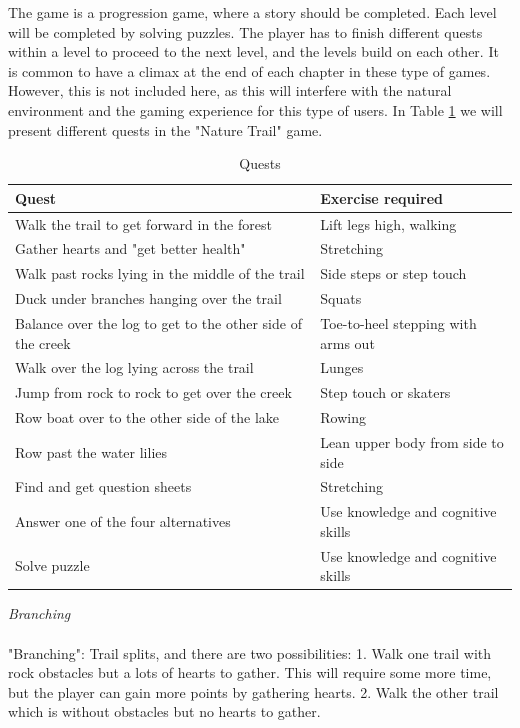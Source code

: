 The game is a progression game, where a story should be completed. Each level will be completed by solving puzzles. The player has to finish different quests within a level to proceed to the next level, and the levels build on each other. It is common to have a climax at the end of each chapter in these type of games. However, this is not included here, as this will interfere with the natural environment and the gaming experience for this type of users. In Table \ref{tab:quests1} we will present different quests in the "Nature Trail" game. 
  
\begin{table}
\begin{tabular}{|>{\raggedright}p{}|p{}|}
\hline
\textbf{Quest} & \textbf{Exercise required}  \\ \hline
Walk the trail to get forward in the forest & Lift legs high, walking  \\ \hline
Gather hearts and "get better health" &  Stretching \\ \hline
Walk past rocks lying in the middle of the trail & Side steps or step touch  \\ \hline
Duck under branches hanging over the trail & Squats
\\ \hline
Balance over the log to get to the other side of the creek & Toe-to-heel stepping with arms out \\ \hline
Walk over the log lying across the trail & Lunges \\ \hline
Jump from rock to rock to get over the creek & Step touch or skaters \\ \hline
Row boat over to the other side of the lake & Rowing \\ \hline
Row past the water lilies & Lean upper body from side to side \\ \hline
Find and get question sheets  & Stretching \\ \hline
Answer one of the four alternatives & Use knowledge and cognitive skills \\ \hline
Solve puzzle & Use knowledge and cognitive skills \\ \hline
\end{tabular}
\caption[Quests in the "Nature trail" game]{Quests}
\label{tab:quests1}
\end{table}
 
\emph{Branching} \\ \\ 
"Branching": Trail splits, and there are two possibilities: 1. Walk one trail with rock obstacles but a lots of hearts to gather. This will require some more time, but the player can gain more points by gathering hearts. 2. Walk the other trail which is without obstacles but no hearts to gather. 

